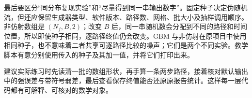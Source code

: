 \documentclass[11pt,a4paper,fontset=none]{ctexart}
\numberwithin{equation}{section}
\begin{document}
最后要区分“同分布复现实验”和“尽量得到同一串输出数字”。固定种子决定伪随机流，但还应保留生成器类型、软件版本、路径数、网格、批大小及抽样调用顺序。非仿射数组是 $(N_f,B,2)$；改变 $B$ 后，同一串随机数会分配到不同的路径和时间位置，所以即使种子相同，逐路径终值仍会改变。GBM 与非仿射在原项目中使用相同种子，也不意味着二者共享可逐路径比较的噪声；它们是两个不同实验。教学脚本有意分别使用传入的种子及其加一值，并将它们打印出来。

建议实际练习时先读清一批的数组形状，再手算一条两步路径，接着核对默认输出中的强误差与带符号弱差，最后查看保存终值能否还原原报告统计。这样每一层代码都有可解释、可核对的数学对象。
\end{document}
